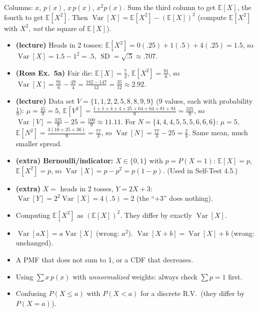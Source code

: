 \documentclass[11pt]{article}
\newcommand{\E}{\mathbb{E}}
\newcommand{\Var}{\operatorname{Var}}
\newcommand{\SD}{\operatorname{SD}}
\begin{document}
\begin{methodbox}
Columns: $x$, $p(x)$, $x\,p(x)$, $x^2p(x)$. Sum the third column to get $\E[X]$, the fourth to get $\E[X^2]$. Then $\Var[X]=\E[X^2]-(\E[X])^2$ (compute $\E[X^2]$ with $X^2$, \emph{not} the square of $\E[X]$).
\end{methodbox}

\begin{exbox}[Examples]
\begin{itemize}
\item \textbf{(lecture)} Heads in 2 tosses: $\E[X^2]=0(.25)+1(.5)+4(.25)=1.5$, so $\Var[X]=1.5-1^2=.5$, $\SD=\sqrt{.5}\approx.707$.
\item \textbf{(Ross Ex.\ 5a)} Fair die: $\E[X]=\tfrac72$, $\E[X^2]=\tfrac{91}6$, so $\Var[X]=\tfrac{91}6-\tfrac{49}4=\tfrac{182-147}{12}=\tfrac{35}{12}\approx2.92$.
\item \textbf{(lecture)} Data set $V=\{1,1,2,2,5,8,8,9,9\}$ (9 values, each with probability $\tfrac19$): $\mu=\tfrac{45}9=5$, $\E[V^2]=\tfrac{1+1+4+4+25+64+64+81+81}9=\tfrac{325}9$, so $\Var[V]=\tfrac{325}9-25=\tfrac{100}9\approx11.11$. For $N=\{4,4,4,5,5,5,6,6,6\}$: $\mu=5$, $\E[N^2]=\tfrac{3(16+25+36)}9=\tfrac{77}3$, so $\Var[N]=\tfrac{77}3-25=\tfrac23$. Same mean, much smaller spread.
\item \textbf{(extra) Bernoulli/indicator:} $X\in\{0,1\}$ with $p=P(X=1)$: $\E[X]=p$, $\E[X^2]=p$, so $\Var[X]=p-p^2=p(1-p)$. (Used in Self-Test 4.5.)
\item \textbf{(extra)} $X=$ heads in 2 tosses, $Y=2X+3$: $\Var[Y]=2^2\Var[X]=4(.5)=2$ (the ``+3'' does nothing).
\end{itemize}
\end{exbox}

\begin{warnbox}
\begin{itemize}
\item Computing $\E[X^2]$ as $(\E[X])^2$. They differ by exactly $\Var[X]$.
\item $\Var[aX]=a\Var[X]$ (wrong: $a^2$). $\Var[X+b]=\Var[X]+b$ (wrong: unchanged).
\item A PMF that does not sum to 1, or a CDF that decreases.
\item Using $\sum x\,p(x)$ with \emph{unnormalized} weights: always check $\sum p=1$ first.
\item Confusing $P(X\le a)$ with $P(X<a)$ for a discrete R.V.\ (they differ by $P(X=a)$).
\end{itemize}
\end{warnbox}
\end{document}
